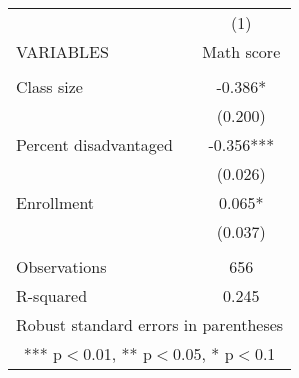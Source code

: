 \documentclass[]{article}
\begin{document}
\begin{tabular}{lc} \hline
 & (1) \\
VARIABLES & Math score \\ \hline
 &  \\
Class size & -0.386* \\
 & (0.200) \\
Percent disadvantaged & -0.356*** \\
 & (0.026) \\
Enrollment & 0.065* \\
 & (0.037) \\
 &  \\
Observations & 656 \\
 R-squared & 0.245 \\ \hline
\multicolumn{2}{c}{ Robust standard errors in parentheses} \\
\multicolumn{2}{c}{ *** p$<$0.01, ** p$<$0.05, * p$<$0.1} \\
\end{tabular}
\end{document}
